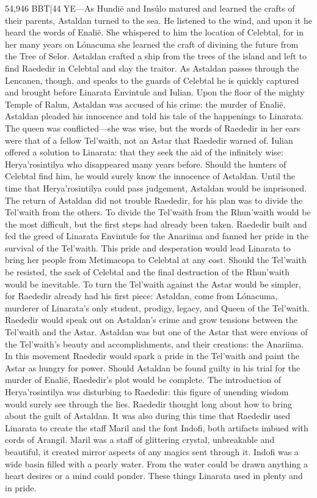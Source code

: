 \documentclass[smalldemyvopaper,11pt,twoside,onecolumn,openright,extrafontsizes]{memoir}
\begin{document}
54,946 BBT|44 YE—As Hundië and Insúlo matured and learned the crafts of their parents, Astaldan turned to the sea. He listened to the wind, and upon it he heard the words of Enalië. She whispered to him the location of Celebtal, for in her many years on Lónacuma she learned the craft of divining the future from the Tree of Selor. Astaldan crafted a ship from the trees of the island and left to find Raededir in Celebtal and slay the traitor. As Astaldan passes through the Lencanen, though, and speaks to the guards of Celebtal he is quickly captured and brought before Linarata Envintule and Iulian. Upon the floor of the mighty Temple of Ralun, Astaldan was accused of his crime: the murder of Enalië. Astaldan pleaded his innocence and told his tale of the happenings to Linarata. The queen was conflicted—she was wise, but the words of Raededir in her ears were that of a fellow Tel’waith, not an Astar that Raededir warned of. Iulian offered a solution to Linarata: that they seek the aid of the infinitely wise: Herya’rosintilya who disappeared many years before. Should the hunters of Celebtal find him, he would surely know the innocence of Astaldan. Until the time that Herya’rosintilya could pass judgement, Astaldan would be imprisoned.
	The return of Astaldan did not trouble Raededir, for his plan was to divide the Tel’waith from the others. To divide the Tel’waith from the Rhun’waith would be the most difficult, but the first steps had already been taken. Raededir built and fed the greed of Linarata Envintule for the Anariima and fanned her pride in the survival of the Tel’waith. This pride and desperation would lead Linarata to bring her people from Metimacopa to Celebtal at any cost. Should the Tel’waith be resisted, the sack of Celebtal and the final destruction of the Rhun’waith would be inevitable. To turn the Tel’waith against the Astar would be simpler, for Raededir already had his first piece: Astaldan, come from Lónacuma, murderer of Linarata’s only student, prodigy, legacy, and Queen of the Tel’waith. Raededir would speak out on Astaldan’s crime and grow tensions between the Tel’waith and the Astar. Astaldan was but one of the Astar that were envious of the Tel’waith’s beauty and accomplishments, and their creations: the Anariima. In this movement Raededir would spark a pride in the Tel’waith and paint the Astar as hungry for power. Should Astaldan be found guilty in his trial for the murder of Enalië, Raededir’s plot would be complete. The introduction of Herya’rosintilya was disturbing to Raededir: this figure of unending wisdom would surely see through the lies. Raededir thought long about how to bring about the guilt of Astaldan.
	It was also during this time that Raededir used Linarata to create the staff Maril and the font Indofi, both artifacts imbued with cords of Arangil. Maril was a staff of glittering crystal, unbreakable and beautiful, it created mirror aspects of any magics sent through it. Indofi was a wide basin filled with a pearly water. From the water could be drawn anything a heart desires or a mind could ponder. These things Linarata used in plenty and in pride.
\end{document}
